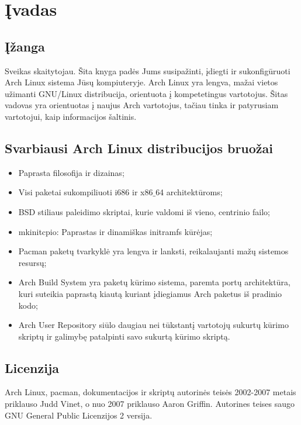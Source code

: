 \documentclass[a4paper]{book}
\begin{document}
\chapter{Įvadas}

  \section{Įžanga}

  Sveikas skaitytojau. Šita knyga padės Jums susipažinti, įdiegti ir sukonfigūruoti
  Arch Linux sistema Jūsų kompiuteryje. Arch Linux yra lengva, mažai
  vietos užimanti GNU/Linux distribucija, orientuota į kompetetingus
  vartotojus. Šitas vadovas yra orientuotas į naujus Arch vartotojus,
  tačiau tinka ir patyrusiam vartotojui, kaip informacijos šaltinis.

  \section{Svarbiausi Arch Linux distribucijos bruožai}
  \begin{itemize}
    \item Paprasta filosofija ir dizainas;
    \item Visi paketai sukompiliuoti i686 ir x86$\_$64 architektūroms;
    \item BSD stiliaus paleidimo skriptai, kurie valdomi iš vieno, centrinio failo;
    \item mkinitcpio: Paprastas ir dinamiškas initramfs kūrėjas;
    \item Pacman paketų tvarkyklė yra lengva ir lanksti, reikalaujanti mažų sistemos resursų;
    \item Arch Build System yra paketų kūrimo sistema, paremta portų
      architektūra, kuri suteikia paprastą kiautą kuriant įdiegiamus Arch
      paketus iš pradinio kodo;
    \item Arch User Repository siūlo daugiau nei tūkstantį vartotojų sukurtų
      kūrimo skriptų ir galimybę patalpinti savo sukurtą kūrimo
      skriptą.
  \end{itemize}

  \section{Licenzija}

  Arch Linux, pacman, dokumentacijos ir skriptų autorinės teisės
  2002-2007 metais priklauso Judd Vinet, o nuo 2007 priklauso Aaron
  Griffin. Autorines teises saugo GNU General Public Licenzijos 2
  versija.
\end{document}
